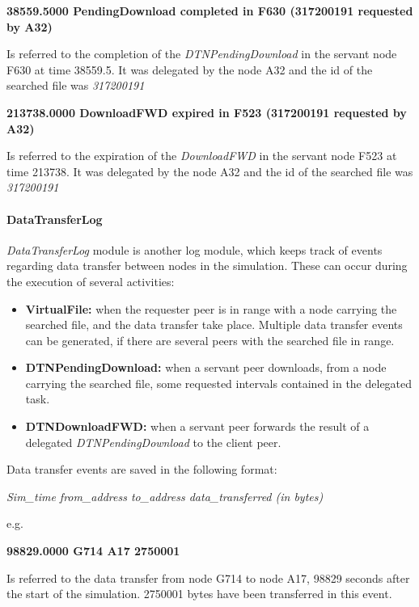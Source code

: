 \begin{center}
\textbf{38559.5000 PendingDownload completed in F630 (317200191 requested by A32)}
\end{center}
Is referred to the completion of the \textit{DTNPendingDownload} in the servant node F630 at time 38559.5. It was delegated by the node A32 and the id of the searched file was \textit{317200191}
\\

\begin{center}
\textbf{213738.0000	DownloadFWD expired in F523 (317200191 requested by A32)}
\end{center}
Is referred to the expiration of the \textit{DownloadFWD} in the servant node F523 at time 213738. It was delegated by the node A32 and the id of the searched file was \textit{317200191}
\\

\paragraph{DataTransferLog}
\textit{DataTransferLog} module is another log module, which keeps track of events regarding data transfer between nodes in the simulation. These can occur during the execution of several activities:
\begin{itemize}
\item \textbf{VirtualFile:} when the requester peer is in range with a node carrying the searched file, and the data transfer take place. Multiple data transfer events can be generated, if there are several peers with the searched file in range.
\item \textbf{DTNPendingDownload:} when a servant peer downloads, from a node carrying the searched file, some requested intervals contained in the delegated task.
\item \textbf{DTNDownloadFWD:} when a servant peer forwards the result of a delegated \textit{DTNPendingDownload} to the client peer.
\end{itemize}
Data transfer events are saved in the following format:
\begin{center}
\textit{Sim\_time	from\_address	to\_address	data\_transferred (in bytes)}
\end{center}
e.g.
\begin{center}
\textbf{98829.0000	G714	A17	2750001}
\end{center}
Is referred to the data transfer from node G714 to node A17, 98829 seconds after the start of the simulation. 2750001 bytes have been transferred in this event.
\\

